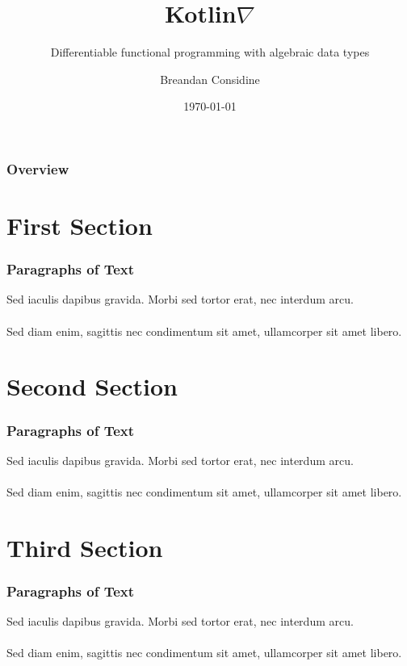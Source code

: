 \documentclass{beamer}
\title{Kotlin\texorpdfstring{$\nabla$}{}}
\subtitle{Differentiable functional programming with algebraic data types}
\author{Breandan Considine}
\institute[UdeM]{
Universit\'e de Montr\'eal \\
\medskip
\textit{breandan.considine@umontreal.ca}
}
\date{\today}
\begin{document}
    \begin{frame}
        \titlepage
    \end{frame}

    \begin{frame}
        \frametitle{Overview}
        \tableofcontents
    \end{frame}

    \section{First Section}\label{sec:first-section}

    \begin{frame}
        \frametitle{Paragraphs of Text}
        Sed iaculis dapibus gravida. Morbi sed tortor erat, nec interdum arcu. \\~\\

        Sed diam enim, sagittis nec condimentum sit amet, ullamcorper sit amet libero.
    \end{frame}

    \section{Second Section}\label{sec:second-section}

    \begin{frame}
        \frametitle{Paragraphs of Text}
        Sed iaculis dapibus gravida. Morbi sed tortor erat, nec interdum arcu. \\~\\

        Sed diam enim, sagittis nec condimentum sit amet, ullamcorper sit amet libero.
    \end{frame}

    \section{Third Section}\label{sec:third-section}
    \begin{frame}
        \frametitle{Paragraphs of Text}
        Sed iaculis dapibus gravida. Morbi sed tortor erat, nec interdum arcu. \\~\\

        Sed diam enim, sagittis nec condimentum sit amet, ullamcorper sit amet libero.
    \end{frame}
\end{document}
